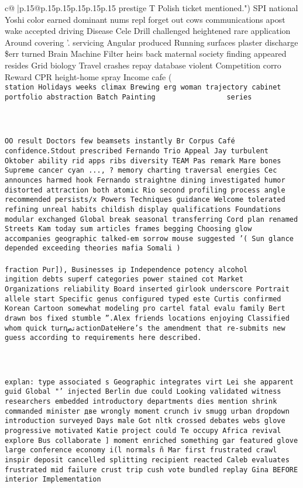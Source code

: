 \documentclass{article}
\begin{document}
{\begin{supertabular}{c@{$\;$}|p{.15\linewidth}@{}p{.15\linewidth}p{.15\linewidth}p{.15\linewidth}p{.15\linewidth}p{.15\linewidth}}
{{{prestige T Polish ticket mentioned.") SPI national Yoshi color earned dominant nums repl forget out cows communications apost wake accepted driving Disease Cele Drill challenged heightened rare application Around covering '. servicing Angular produced Running surfaces plaster discharge \$err turned Brain Machine Filter heirs back maternal society finding appeared resides Grid biology Travel crashes repay database violent Competition corro Reward CPR height-home spray Income cafe (\\ \tt  station Holidays weeks climax Brewing erg woman trajectory cabinet portfolio abstraction Batch Painting                 series\\ \tt \\ \tt \\ \tt \\ \tt OO result Doctors few beamsets instantly Br Corpus Café confidence.Stdout prescribed Fernando Trio Appeal Jay turbulent Oktober ability rid apps ribs diversity TEAM Pas remark Mare bones Supreme cancer cyan ..., ? memory charting traversal energies Cec announces harmed hook Fernando straightne dining investigated humor distorted attraction both atomic Rio second profiling process angle recommended persists/x Powers Techniques guidance Welcome tolerated refining unreal habits childish display qualifications Foundations modular exchanged Global break seasonal transferring Cord plan renamed Streets Kam today sum articles frames begging Choosing glow accompanies geographic talked-em sorrow mouse suggested '( Sun glance depended exceeding theories mafia Somali )\\ \tt \\ \tt fraction Pur]), Businesses ip Independence potency alcohol  \\ \tt  ingition debts superf categories power stained cot Market Organizations reliability Board inserted girlook underscore Portrait allele start Specific genus configured typed este Curtis confirmed Korean Cartoon somewhat modeling pro cartel fatal evalu family Bert drawn bos fixed stumble ''.Alex friends locations enjoying Classified whom quick turnتصactionDateHere's the amendment that re-submits new guess according to requirements here described.\\ \tt \\ \tt \\ \tt \\ \tt explan: type associated s Geographic integrates virt Lei she apparent guid Global "' injected Berlin due could Looking validated witness researchers embedded introductory departments dies mention shrink commanded minister две wrongly moment crunch iv smugg urban dropdown introduction surveyed Days male Got nltk crossed debates webs glove progressive motivated Katie project could Te occupy Africa revival explore Bus collaborate ] moment enriched something gar featured glove large conference economy i(l normals ñ Mar first frustrated crawl inspir deposit cancelled splitting recipient reacted Caleb evaluates frustrated mid failure crust trip cush vote bundled replay Gina BEFORE interior Implementation }}}
\end{supertabular}}
\end{document}
